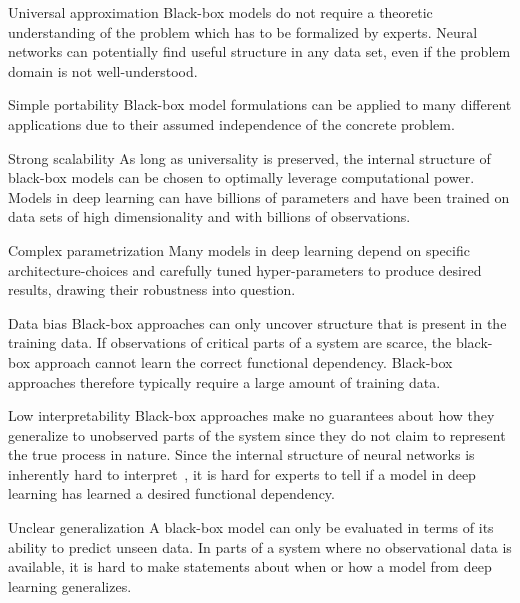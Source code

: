 \begin{Pros}
    \begin{compactdesc}
        \item[Universal approximation]
        Black-box models do not require a theoretic understanding of the problem which has to be formalized by experts.
        Neural networks can potentially find useful structure in any data set, even if the problem domain is not well-understood.
        \item[Simple portability]
        Black-box model formulations can be applied to many different applications due to their assumed independence of the concrete problem.
        \item[Strong scalability]
        As long as universality is preserved, the internal structure of black-box models can be chosen to optimally leverage computational power.
        Models in deep learning can have billions of parameters and have been trained on data sets of high dimensionality and with billions of observations.
    \end{compactdesc}
\end{Pros}

\begin{Cons}
    \begin{compactdesc}
        \item[Complex parametrization]
        Many models in deep learning depend on specific architecture-choices and carefully tuned hyper-parameters to produce desired results, drawing their robustness into question.
        \item[Data bias]
        Black-box approaches can only uncover structure that is present in the training data.
        If observations of critical parts of a system are scarce, the black-box approach cannot learn the correct functional dependency.
        Black-box approaches therefore typically require a large amount of training data.
        \item[Low interpretability]
        Black-box approaches make no guarantees about how they generalize to unobserved parts of the system since they do not claim to represent the true process in nature.
        Since the internal structure of neural networks is inherently hard to interpret~\parencite{rudin_stop_2019}, it is hard for experts to tell if a model in deep learning has learned a desired functional dependency.
        \item[Unclear generalization]
        A black-box model can only be evaluated in terms of its ability to predict unseen data.
        In parts of a system where no observational data is available, it is hard to make statements about when or how a model from deep learning generalizes.
    \end{compactdesc}
\end{Cons}


